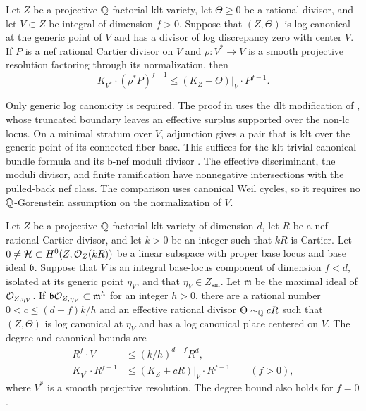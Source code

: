 \begin{lemma}
\label{j:subadjunction}
Let $Z$ be a projective $\mathbb Q$-factorial klt variety, let
$\Theta\geq0$ be a rational divisor, and let $V\subset Z$ be
integral of dimension $f>0$.  Suppose that $(Z,\Theta)$ is log
canonical at the generic point of $V$ and has a divisor of log
discrepancy zero with center $V$.  If $P$ is a nef rational Cartier
divisor on $V$ and $\rho:V^*\to V$ is a smooth projective resolution
factoring through its normalization, then
\[
 K_{V^*}\cdot(\rho^*P)^{f-1}
 \leq (K_Z+\Theta)|_V\cdot P^{f-1}.
\]
\end{lemma}

Only generic log canonicity is required.  The proof in \cite{LA}
uses the dlt modification of \cite[Theorem~2.10]{FH}, whose
truncated boundary leaves an effective surplus supported over
the non-lc locus.  On a minimal stratum over $V$, adjunction
gives a pair that is klt over the generic point of its
connected-fiber base.  This suffices for the klt-trivial
canonical bundle formula and its b-nef moduli divisor
\cite[Definition~3.1 and Theorem~3.5]{FG}.  The effective
discriminant, the moduli divisor, and finite ramification have
nonnegative intersections with the pulled-back nef class.
The comparison uses canonical Weil cycles, so it requires no
$\mathbb Q$-Gorenstein assumption on the normalization of $V$.

\begin{lemma}
\label{j:base-component}
Let $Z$ be a projective $\mathbb Q$-factorial klt variety of dimension
$d$, let $R$ be a nef rational Cartier divisor, and let $k>0$
be an integer such that $kR$ is Cartier.  Let
$0\ne\mathcal H\subset H^0(Z,\mathcal O_Z(kR))$ be a linear subspace
with proper base locus and base ideal $\mathfrak b$.  Suppose that
$V$ is an integral base-locus component of dimension $f<d$,
isolated at its generic point $\eta_V$, and that
$\eta_V\in Z_{\mathrm{sm}}$.  Let
$\mathfrak m$ be the maximal ideal of $\mathcal O_{Z,\eta_V}$.
If $\mathfrak b\mathcal O_{Z,\eta_V}\subset\mathfrak m^h$ for an
integer $h>0$, there are a rational number $0<c\leq(d-f)k/h$ and an
effective rational divisor $\Theta\sim_{\mathbb Q}cR$ such that
$(Z,\Theta)$ is log canonical at $\eta_V$ and has a log canonical
place centered on $V$.  The degree and canonical bounds are
\begin{equation}
\label{j:base-bounds}
 \begin{split}
 R^f\cdot V&\leq(k/h)^{d-f}R^d,\\
 K_{V^*}\cdot R^{f-1}
   &\leq(K_Z+cR)|_V\cdot R^{f-1}\qquad(f>0),
 \end{split}
\end{equation}
where $V^*$ is a smooth projective resolution.  The degree bound
also holds for $f=0$.
\end{lemma}

